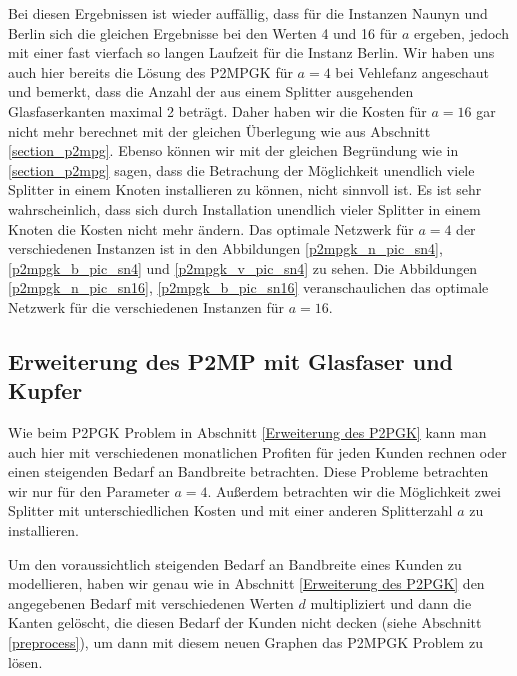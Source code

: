 \documentclass[11pt,a4paper]{article}
\theoremstyle{my_th_style1}
\begin{document}
Bei diesen Ergebnissen ist wieder auff\"allig, dass f\"ur die Instanzen Naunyn und Berlin sich die gleichen Ergebnisse bei den Werten 4 und 16 f\"ur \(a\) ergeben, jedoch mit einer fast vierfach so langen Laufzeit f\"ur die Instanz Berlin.
Wir haben uns auch hier bereits die L\"osung des P2MPGK f\"ur \(a=4\) bei Vehlefanz angeschaut und bemerkt, dass die Anzahl der aus einem Splitter ausgehenden Glasfaserkanten maximal 2 betr\"agt.
Daher haben wir die Kosten f\"ur \(a = 16\) gar nicht mehr berechnet mit der gleichen \"Uberlegung wie aus Abschnitt \ref{section_p2mpg}.
Ebenso k\"onnen wir mit der gleichen Begr\"undung wie in \ref{section_p2mpg} sagen, dass die Betrachung der M\"oglichkeit unendlich viele Splitter in einem Knoten installieren zu k\"onnen, nicht sinnvoll ist. Es ist sehr wahrscheinlich, dass sich durch Installation unendlich vieler Splitter in einem Knoten die Kosten nicht mehr ändern.
Das optimale Netzwerk für $a=4$ der verschiedenen Instanzen ist in den Abbildungen \eqref{p2mpgk_n_pic_sn4}, \eqref{p2mpgk_b_pic_sn4} und \eqref{p2mpgk_v_pic_sn4} zu sehen. Die Abbildungen \eqref{p2mpgk_n_pic_sn16}, \eqref{p2mpgk_b_pic_sn16} veranschaulichen das optimale Netzwerk für die verschiedenen Instanzen für $a=16$.
   
 \subsection{Erweiterung des P2MP mit Glasfaser und Kupfer}
Wie beim P2PGK Problem in Abschnitt \ref{Erweiterung des P2PGK} kann man auch hier mit verschiedenen monatlichen Profiten f\"ur jeden Kunden rechnen oder einen steigenden Bedarf an Bandbreite betrachten. Diese Probleme betrachten wir nur für den Parameter $a=4$.
Außerdem betrachten wir die Möglichkeit zwei Splitter mit unterschiedlichen Kosten und mit einer anderen Splitterzahl $a$ zu installieren.
 
Um den voraussichtlich steigenden Bedarf an Bandbreite eines Kunden zu modellieren, haben wir genau wie in Abschnitt \ref{Erweiterung des P2PGK} den angegebenen Bedarf mit verschiedenen Werten $d$ multipliziert und dann die Kanten gel\"oscht, die diesen Bedarf der Kunden nicht decken (siehe Abschnitt \ref{preprocess}), um dann mit diesem neuen Graphen das P2MPGK Problem zu l\"osen.
 
\end{document}
